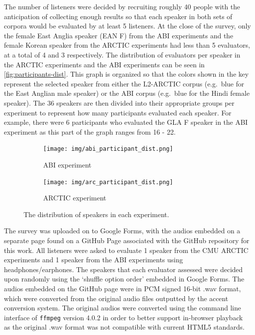 \documentclass
[
    a4paper,
    twoside,
    12pt,
]
{report}
\begin{document}
The number of listeners were decided by recruiting roughly 40 people
with the anticipation of collecting enough results so that each speaker
in both sets of corpora would be evaluated by at least 5 listeners. At
the close of the survey, only the female East Anglia speaker (EAN F)
from the ABI experiments and the female Korean speaker from the ARCTIC
experiments had less than 5 evaluators, at a total of 4 and 3
respectively. The distribution of evaluators per speaker in the ARCTIC
experiments and the ABI experiments can be seen in
\autoref{fig:participants-dist}. This graph is organized so that the
colors shown in the key represent the selected speaker from either the
L2-ARCTIC corpus (e.g.~blue for the East Anglian male speaker) or the
ABI corpus (e.g.~blue for the Hindi female speaker). The 36 speakers are
then divided into their appropriate groups per experiment to represent
how many participants evaluated each speaker. For example, there were 6
participants who evaluated the GLA F speaker in the ABI experiment as
this part of the graph ranges from 16 - 22.

\begin{figure}[]
   \centering
   \begin{subfigure}[b]{1\textwidth}
      \texttt{[image: img/abi\_participant\_dist.png]}
         \caption{ABI experiment}
         \label{fig:abi-participant-dist-graphics}
   \end{subfigure}
   \quad
   \begin{subfigure}[b]{1\textwidth}
      \texttt{[image: img/arc\_participant\_dist.png]}
         \caption{ARCTIC experiment}
         \label{fig:arc-participant-dist-graphics}
   \end{subfigure} 
   \quad
   \caption{The distribution of speakers in each experiment.}
   \label{fig:participants-dist}
\end{figure}

The survey was uploaded on to Google Forms, with the audios embedded on
a separate page found on a GitHub Page associated with the GitHub
repository for this work. All listeners were asked to evaluate 1 speaker
from the CMU ARCTIC experiments and 1 speaker from the ABI experiments
using headphones/earphones. The speakers that each evaluator assessed
were decided upon randomly using the `shuffle option order' embedded in
Google Forms. The audios embedded on the GitHub page were in PCM signed
16-bit .wav format, which were converted from the original audio files
outputted by the accent conversion system. The original audios were
converted using the command line interface of \texttt{ffmpeg} version
4.0.2 in order to better support in-browser playback as the original
.wav format was not compatible with current HTML5 standards.
\end{document}
